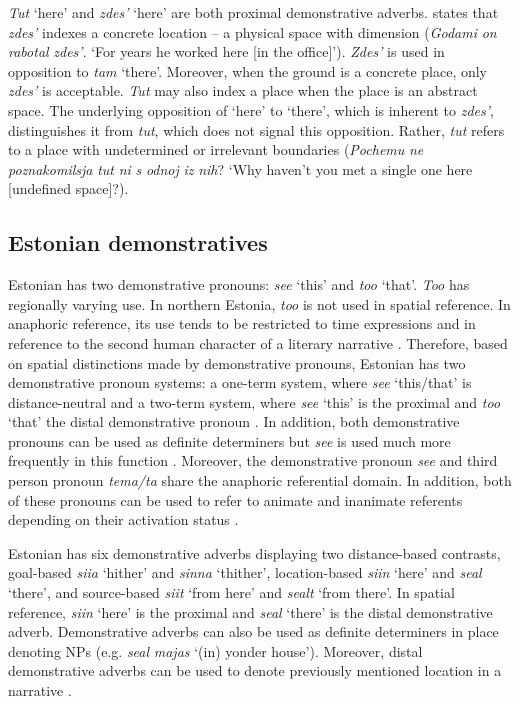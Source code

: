 \documentclass[output=paper,colorlinks,citecolor=brown]{langscibook}
\begin{document}
\textit{Tut} ‘here’ and \textit{zdes’} ‘here’ are both proximal demonstrative adverbs. \citet[105-106]{Grenoble1998} states that \textit{zdes’} indexes a concrete location – a physical space with dimension (\textit{Godami} \textit{on} \textit{rabotal} \textit{zdes’}. ‘For years he worked here [in the office]’). \textit{Zdes’} is used in opposition to \textit{tam} ‘there’. Moreover, when the ground is a concrete place, only \textit{zdes’} is acceptable. \textit{Tut} may also index a place when the place is an abstract space. The underlying opposition of ‘here’ to ‘there’, which is inherent to \textit{zdes’}, distinguishes it from \textit{tut}, which does not signal this opposition. Rather, \textit{tut} refers to a place with undetermined or irrelevant boundaries (\textit{Pochemu} \textit{ne} \textit{poznakomilsja} \textit{tut} \textit{ni} \textit{s} \textit{odnoj} \textit{iz} \textit{nih}? ‘Why haven’t you met a single one here [undefined space]?).

\subsection{Estonian demonstratives}\label{sec:nahkola:3.2}

Estonian has two demonstrative pronouns: \textit{see} ‘this’ and \textit{too} ‘that’. \textit{Too} has regionally varying use. In northern Estonia, \textit{too} is not used in spatial reference. In anaphoric reference, its use tends to be restricted to time expressions and in reference to the second human character of a literary narrative \citep{Pajusalu2006}. Therefore, based on spatial distinctions made by demonstrative pronouns, Estonian has two demonstrative pronoun systems: a one-term system, where \textit{see} ‘this/that’ is distance-neutral \citep{Reile2015,Pajusalu2009} and a two-term system, where \textit{see} ‘this’ is the proximal and \textit{too} ‘that’ the distal demonstrative pronoun \citep{Reile2016}. In addition, both demonstrative pronouns can be used as definite determiners but \textit{see} is used much more frequently in this function \citep{Pajusalu2009}. Moreover, the demonstrative pronoun \textit{see} and third person pronoun \textit{tema/ta} share the anaphoric referential domain. In addition, both of these pronouns can be used to refer to animate and inanimate referents depending on their activation status \citep{Pajusalu2017}.

Estonian has six demonstrative adverbs displaying two distance-based contrasts, goal-based \textit{siia} ‘hither’ and \textit{sinna} ‘thither’, location-based \textit{siin} ‘here’ and \textit{seal} ‘there’, and source-based \textit{siit} ‘from here’ and \textit{sealt} ‘from there’. In spatial reference, \textit{siin} ‘here’ is the proximal and \textit{seal} ‘there’ is the distal demonstrative adverb. Demonstrative adverbs can also be used as definite determiners in place denoting NPs (e.g. \textit{seal} \textit{majas} ‘(in) yonder house’). Moreover, distal demonstrative adverbs can be used to denote previously mentioned location in a narrative \citep{Pajusalu2017}.
\end{document}
